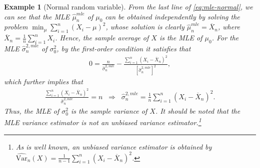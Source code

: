 \documentclass[10.5pt, A4paper, openany, uplatex]{book}
\newcommand{\Var}{\mathrm{Var}}
\renewcommand{\hat}{\widehat}
\renewcommand{\bar}{\overline}
\newtheorem{example}[theorem]{Example}
\numberwithin{equation}{section}
\begin{document}
\begin{example}[Normal random variable]
From the last line of \eqref{eq:mle-normal}, we can see that the MLE $\hat{\mu}^{mle}_n$ of $\mu_0$ can be obtained independently by solving the problem $\min_\mu \sum_{i=1}^n (X_i - \mu)^2$, whose solution is clearly $ \hat{\mu}^{mle}_n = \bar X_n$, where $\bar X_n = \frac{1}{n}\sum_{i=1}^n X_i$.
Hence, the sample average of $X$ is the MLE of $\mu_0$.
For the MLE $\hat{\sigma}^{2, mle}_n$ of $\sigma^2_0$, by the first-order condition it satisfies that
\begin{align*}
	0 = \frac{n}{\hat{\sigma}^{2, mle}_n} - \frac{\sum_{i=1}^n (X_i - \bar X_n)^2}{ \left[\hat{\sigma}^{2, mle}_n \right]^2 },
\end{align*}
which further implies that
\begin{align*}
 \frac{\sum_{i=1}^n (X_i - \bar X_n)^2}{ \hat{\sigma}^{2, mle}_n  } = n \;\; \Rightarrow \;\; \hat{\sigma}^{2, mle}_n = \frac{1}{n} \sum_{i=1}^n (X_i - \bar X_n)^2.
\end{align*}
Thus, the MLE of $\sigma_0^2$ is the sample variance of $X$.
It should be noted that the MLE variance estimator is not an unbiased variance estimator.\footnote{
	As is well known, an unbiased variance estimator is obtained by $\hat{\Var}_n(X) = \frac{1}{n-1}\sum_{i=1}^n (X_i - \bar X_n)^2$.
	}

\end{example}
\end{document}
